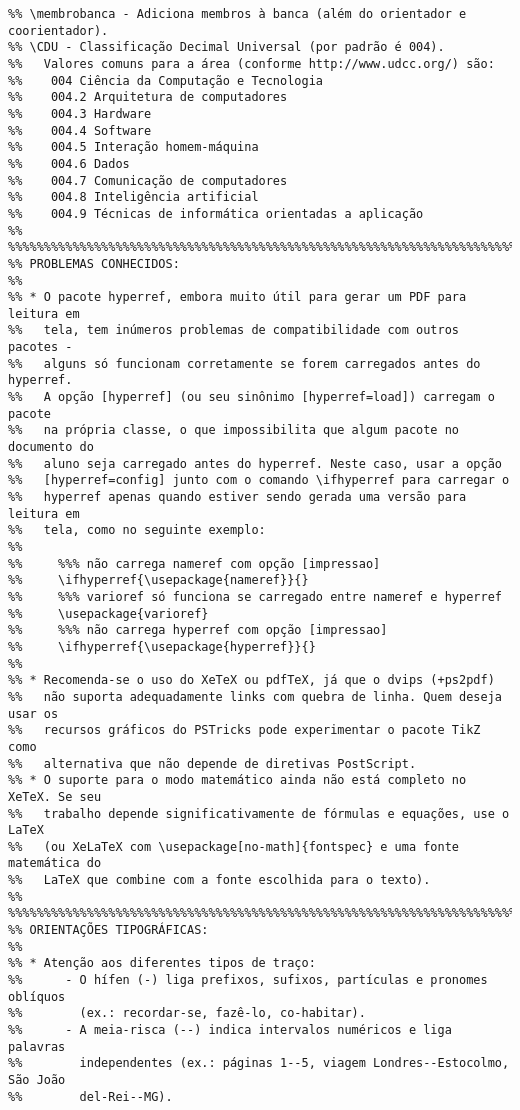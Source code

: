 \begin{verbatim}
%% \membrobanca - Adiciona membros à banca (além do orientador e coorientador).
%% \CDU - Classificação Decimal Universal (por padrão é 004).
%%   Valores comuns para a área (conforme http://www.udcc.org/) são:
%%    004 Ciência da Computação e Tecnologia
%%    004.2	Arquitetura de computadores
%%    004.3	Hardware
%%    004.4	Software
%%    004.5	Interação homem-máquina
%%    004.6	Dados
%%    004.7	Comunicação de computadores
%%    004.8	Inteligência artificial
%%    004.9	Técnicas de informática orientadas a aplicação
%%
%%%%%%%%%%%%%%%%%%%%%%%%%%%%%%%%%%%%%%%%%%%%%%%%%%%%%%%%%%%%%%%%%%%%%%%%%%%%%%%
%% PROBLEMAS CONHECIDOS:
%%
%% * O pacote hyperref, embora muito útil para gerar um PDF para leitura em
%%   tela, tem inúmeros problemas de compatibilidade com outros pacotes -
%%   alguns só funcionam corretamente se forem carregados antes do hyperref.
%%   A opção [hyperref] (ou seu sinônimo [hyperref=load]) carregam o pacote
%%   na própria classe, o que impossibilita que algum pacote no documento do
%%   aluno seja carregado antes do hyperref. Neste caso, usar a opção
%%   [hyperref=config] junto com o comando \ifhyperref para carregar o
%%   hyperref apenas quando estiver sendo gerada uma versão para leitura em
%%   tela, como no seguinte exemplo:
%%
%%     %%% não carrega nameref com opção [impressao] 
%%     \ifhyperref{\usepackage{nameref}}{}
%%     %%% varioref só funciona se carregado entre nameref e hyperref
%%     \usepackage{varioref}
%%     %%% não carrega hyperref com opção [impressao] 
%%     \ifhyperref{\usepackage{hyperref}}{}
%%
%% * Recomenda-se o uso do XeTeX ou pdfTeX, já que o dvips (+ps2pdf)
%%   não suporta adequadamente links com quebra de linha. Quem deseja usar os
%%   recursos gráficos do PSTricks pode experimentar o pacote TikZ como
%%   alternativa que não depende de diretivas PostScript.
%% * O suporte para o modo matemático ainda não está completo no XeTeX. Se seu
%%   trabalho depende significativamente de fórmulas e equações, use o LaTeX
%%   (ou XeLaTeX com \usepackage[no-math]{fontspec} e uma fonte matemática do
%%   LaTeX que combine com a fonte escolhida para o texto).
%%
%%%%%%%%%%%%%%%%%%%%%%%%%%%%%%%%%%%%%%%%%%%%%%%%%%%%%%%%%%%%%%%%%%%%%%%%%%%%%%%
%% ORIENTAÇÕES TIPOGRÁFICAS:
%%
%% * Atenção aos diferentes tipos de traço:
%%      - O hífen (-) liga prefixos, sufixos, partículas e pronomes oblíquos
%%        (ex.: recordar-se, fazê-lo, co-habitar).
%%      - A meia-risca (--) indica intervalos numéricos e liga palavras
%%        independentes (ex.: páginas 1--5, viagem Londres--Estocolmo, São João
%%        del-Rei--MG).

\end{verbatim}
